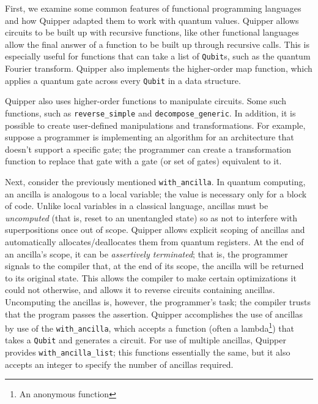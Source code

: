 \documentclass[]{article}
\begin{document}
First, we examine some common features of functional programming languages and how Quipper adapted them to work with quantum values. Quipper allows circuits to be built up with recursive functions, like other functional languages allow the final answer of a function to be built up through recursive calls. This is especially useful for functions that can take a list of \texttt{Qubit}s, such as the quantum Fourier transform. Quipper also implements the higher-order map function, which applies a quantum gate across every \texttt{Qubit} in a data structure.

Quipper also uses higher-order functions to manipulate circuits. Some such functions, such as \verb|reverse_simple| and \verb|decompose_generic|. In addition, it is possible to create user-defined manipulations and transformations. For example, suppose a programmer is implementing an algorithm for an architecture that doesn't support a specific gate; the programmer can create a transformation function to replace that gate with a gate (or set of gates) equivalent to it.

Next, consider the previously mentioned \verb|with_ancilla|. In quantum computing, an ancilla is analogous to a local variable; the value is necessary only for a block of code. Unlike local variables in a classical language, ancillas must be \textit{uncomputed} (that is, reset to an unentangled state) so as not to interfere with superpositions once out of scope. Quipper allows explicit scoping of ancillas and automatically allocates/deallocates them from quantum registers. At the end of an ancilla's scope, it can be \textit{assertively terminated}; that is, the programmer signals to the compiler that, at the end of its scope, the ancilla will be returned to its original state. This allows the compiler to make certain optimizations it could not otherwise, and allows it to reverse circuits containing ancillas. Uncomputing the ancillas is, however, the programmer's task; the compiler trusts that the program passes the assertion. Quipper accomplishes the use of ancillas by use of the \verb|with_ancilla|, which accepts a function (often a lambda\footnote{An anonymous function}) that takes a \texttt{Qubit} and generates a circuit. For use of multiple ancillas, Quipper provides \verb|with_ancilla_list|; this functions essentially the same, but it also accepts an integer to specify the number of ancillas required.
\end{document}
